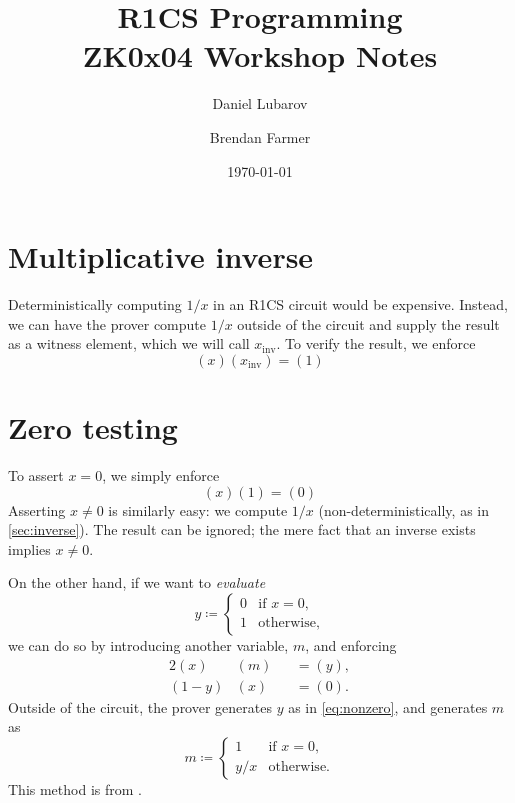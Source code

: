 \documentclass{article}
\title{R1CS Programming \\ \large ZK0x04 Workshop Notes}
\author{Daniel Lubarov \and Brendan Farmer}
\date{\today}
\begin{document}
\maketitle

{\hypersetup{hidelinks} \tableofcontents}
\newpage


\section{Multiplicative inverse} \label{sec:inverse}

Deterministically computing $1 / x$ in an R1CS circuit would be expensive. Instead, we can have the prover compute $1 / x$ outside of the circuit and supply the result as a witness element, which we will call $x_\mathrm{inv}$. To verify the result, we enforce
\begin{equation}
  (x) (x_\mathrm{inv}) = (1)
\end{equation}


\section{Zero testing} \label{sec:zerotest}

To assert $x = 0$, we simply enforce
\begin{equation}
  (x) (1) = (0)
\end{equation}
Asserting $x \ne 0$ is similarly easy: we compute $1 / x$ (non-deterministically, as in \autoref{sec:inverse}). The result can be ignored; the mere fact that an inverse exists implies $x \ne 0$.

On the other hand, if we want to \textit{evaluate}
\begin{equation} \label{eq:nonzero}
  y \coloneqq
  \begin{cases}
    0 & \text{if $x = 0$,} \\
    1 & \text{otherwise,}
  \end{cases}
\end{equation}
we can do so by introducing another variable, $m$, and enforcing
\begin{alignat}{2}
  (x)     & (m) &&= (y), \\
  (1 - y) & (x) &&= (0).
\end{alignat}
Outside of the circuit, the prover generates $y$ as in \autoref{eq:nonzero}, and generates $m$ as
\begin{equation}
  m \coloneqq
  \begin{cases}
    1 & \text{if $x = 0$,} \\
    y / x & \text{otherwise.}
  \end{cases}
\end{equation}
This method is from \cite{parno2013pinocchio}.
\end{document}
